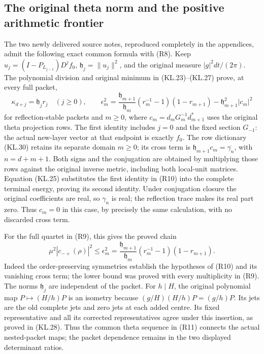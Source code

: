 \subsection{The original theta norm and the positive arithmetic frontier}

The two newly delivered source notes, reproduced completely in the
appendices, admit the following exact common formula with (R8).
Keep \(u_j=(I-P_{L_{j-1}})D^jf_0\),
\(\mathfrak h_j=\|u_j\|^2\), and the original measure
\(|g|^2dt/(2\pi)\).  The polynomial division and original
minimum in (KL.23)--(KL.27) prove, at every full packet,
\[
 \kappa_{d+j}=\mathfrak h_jr_j\quad(j\ge0),\qquad
 \epsilon_m^2=
 \frac{\mathfrak h_{m+1}}{\mathfrak h_m}
       (r_m^{-1}-1)(1-r_{m+1})
       -\mathfrak h_{m+1}^2|c_m|^2
 \tag{R10}
\]
for reflection-stable packets and \(m\ge0\), where
\(c_m=d_mG_m^{-1}d_{m+1}^*\) uses the original theta
projection rows.  The first identity includes \(j=0\) and
the fixed section \(G_{-1}\): the actual new-layer vector
at that endpoint is exactly \(f_0\).  The row dictionary
(KL.30) retains its separate domain \(m\ge0\); its
cross term is \(\mathfrak h_{m+1}c_m=\overline{\gamma_n}\),
with \(n=d+m+1\).  Both signs and the conjugation are
obtained by multiplying those rows against the original inverse
metric, including both local-unit matrices.  Equation (KL.25)
substitutes the first identity in (R10) into the complete terminal
energy, proving its second identity.  Under conjugation closure
the original coefficients are real, so \(\gamma_n\) is real;
the reflection trace makes its real part zero.  Thus \(c_m=0\)
in this case, by precisely the same calculation, with no discarded
cross term.

For the full quartet in (R9), this gives the proved chain
\[
 \boxed{
 \mu^2|c_{-+}(\rho)|^2
 \le\epsilon_m^2
 =\frac{\mathfrak h_{m+1}}{\mathfrak h_m}
              (r_m^{-1}-1)(1-r_{m+1}).}
 \tag{R11}
\]
Indeed the order-preserving symmetries establish the hypotheses of
(R10) and its vanishing cross term; the lower bound was proved
with every multiplicity in (R9).  The norms \(\mathfrak h_j\)
are independent of the packet.  For \(h\mid H\), the
original polynomial map \(P\mapsto(H/h)P\) is an isometry
because \((g/H)(H/h)P=(g/h)P\).  Its jets are the old
complete jets and zero jets at each added centre.  Its fixed
representative and all its corrected representatives agree under
this insertion, as proved in (KL.28).  Thus the common theta
sequence in (R11) connects the actual nested-packet maps; the
packet dependence remains in the two displayed determinant ratios.

